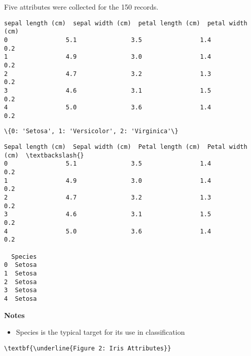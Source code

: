 \documentclass[11pt]{article}
\providecommand{\tightlist}{%
      \setlength{\itemsep}{0pt}\setlength{\parskip}{0pt}}
\begin{document}
    Five attributes were collected for the 150 records.

    
    \begin{Verbatim}[commandchars=\\\{\}]
   sepal length (cm)  sepal width (cm)  petal length (cm)  petal width (cm)
0                5.1               3.5                1.4               0.2
1                4.9               3.0                1.4               0.2
2                4.7               3.2                1.3               0.2
3                4.6               3.1                1.5               0.2
4                5.0               3.6                1.4               0.2
    \end{Verbatim}

    
            \begin{tcolorbox}[breakable, size=fbox, boxrule=.5pt, pad at break*=1mm, opacityfill=0]
\begin{Verbatim}[commandchars=\\\{\}]
\{0: 'Setosa', 1: 'Versicolor', 2: 'Virginica'\}
\end{Verbatim}
\end{tcolorbox}
        
            \begin{tcolorbox}[breakable, size=fbox, boxrule=.5pt, pad at break*=1mm, opacityfill=0]
\begin{Verbatim}[commandchars=\\\{\}]
   Sepal length (cm)  Sepal width (cm)  Petal length (cm)  Petal width (cm)  \textbackslash{}
0                5.1               3.5                1.4               0.2
1                4.9               3.0                1.4               0.2
2                4.7               3.2                1.3               0.2
3                4.6               3.1                1.5               0.2
4                5.0               3.6                1.4               0.2

  Species
0  Setosa
1  Setosa
2  Setosa
3  Setosa
4  Setosa
\end{Verbatim}
\end{tcolorbox}
        
    \textbf{Notes}

\begin{itemize}
\tightlist
\item
  Species is the typical target for its use in classification
\end{itemize}

    \begin{Verbatim}[commandchars=\\\{\}]
\textbf{\underline{Figure 2: Iris Attributes}}
    \end{Verbatim}
\end{document}
